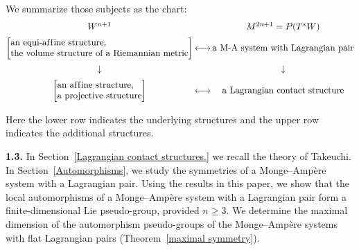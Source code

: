 \documentclass[pdftex]{sigma}
\begin{document}
We summarize those subjects as the chart:
\begin{gather*}
\begin{array}{@{}c@{\,}c@{\,}c@{}}
W^{n+1} & &  M^{2n+1}=P(T^*W)
\vspace{0.2truecm}
\\
\left[
{\begin{array}{@{}l@{}}
{\mbox{\rm an equi-af\/f\/ine structure, }}\\
{\mbox{\rm the volume structure of a Riemannian metric}}
\end{array}
}
\right]
\vspace{0.2truecm}
& \longleftrightarrow &
{\mbox{\rm a M-A system with Lagrangian pair}}
\\
\downarrow & & \downarrow
\vspace{0.2truecm}
\\
\left[
{\begin{array}{@{}l@{}}
{\mbox{\rm an af\/f\/ine structure,}} \\
{\mbox{\rm a projective structure}}
\end{array}
}
\right]
\vspace{0.2truecm}
& \longleftrightarrow &
{\mbox{\rm a Lagrangian contact structure}}
\end{array}
\end{gather*}
Here the lower row indicates the underlying structures and
the upper row indicates the additional structures.


{\bf 1.3.}
In Section~\ref{Lagrangian contact structures.} we recall the theory of Takeuchi.
In Section~\ref{Automorphisms}, we study the sym\-met\-ries of a Monge--Amp{\`e}re system
with a Lagrangian pair. Using the results in this paper,
we show that the local automorphisms of
a Monge--Amp{\`e}re system with
a Lagrangian pair form a f\/inite-dimensional Lie pseudo-group,
provided $n\geq 3$.
We determine the maximal dimension of the automorphism pseudo-groups
of the Monge--Amp{\`e}re systems with f\/lat Lagrangian pairs
(Theorem~\ref{maximal symmetry}).
\end{document}
